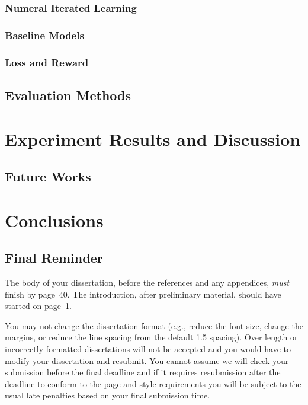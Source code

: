 \documentclass[msc,deptreport]{infthesis} %
\begin{document}
\subsection{Numeral Iterated Learning}
\label{ssec3.2.2:3phase}

\subsection{Baseline Models}
\label{ssec3.2.3:baselines}

\subsection{Loss and Reward}
\label{ssec3.2.4:loss_reward}

\section{Evaluation Methods}
\label{sec3.3:evaluation}




\chapter{Experiment Results and Discussion}
\label{ch4:results_analysis}

\section{Future Works}
\label{sec4.2:future_work}


\chapter{Conclusions}
\label{ch5:conclusion}

\section{Final Reminder}

The body of your dissertation, before the references and any appendices,
\emph{must} finish by page~40. The introduction, after preliminary material,
should have started on page~1.

You may not change the dissertation format (e.g., reduce the font
size, change the margins, or reduce the line spacing from the default
1.5 spacing). Over length or incorrectly-formatted dissertations will
not be accepted and you would have to modify your dissertation and
resubmit.  You cannot assume we will check your submission before the
final deadline and if it requires resubmission after the deadline to
conform to the page and style requirements you will be subject to the
usual late penalties based on your final submission time.
\end{document}
